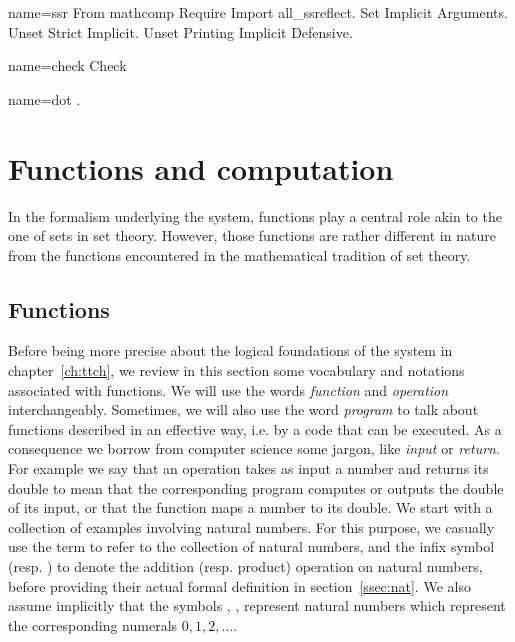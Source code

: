 \begin{coqdef}{name=ssr}
 From mathcomp Require Import all_ssreflect.
 Set Implicit Arguments.
 Unset Strict Implicit.
 Unset Printing Implicit Defensive.
\end{coqdef}
\begin{coqdef}{name=check}
Check
\end{coqdef}
\begin{coqdef}{name=dot}
.
\end{coqdef}

\chapter{Functions and computation}\label{ch:prog}

In the formalism underlying the \Coq{} system, functions play a
central role akin to the one of sets in set theory. However,
those functions are rather different in nature from the
functions encountered in the mathematical tradition of set theory.

\section{Functions}\label{sec:functions}
 Before being more
precise about the logical foundations of the \Coq{} system in
chapter~\ref{ch:ttch},
we review in this section some vocabulary and notations associated
with functions.
We will use the words \emph{function} and \emph{operation}
interchangeably. Sometimes, we will also use the word \emph{program}
to talk about functions described in an effective way, i.e. by a code
that can be executed. As a consequence we borrow from computer science
some jargon, like \emph{input} or \emph{return}. For example we say that
an operation takes as input a number and returns its double to mean
that the corresponding program computes or outputs the double of its
input, or that the function maps a number to its double. We start with
a collection of examples involving natural numbers. For this purpose,
we casually use the \Coq{} term  to refer to the collection of natural
numbers, and the infix symbol  \C{+} (resp. \C{*}) to denote the  addition
(resp. product) operation on natural numbers, before providing their
actual formal definition in section~\ref{ssec:nat}. We also
assume implicitly that the \Coq{} symbols  , , 
represent natural numbers which represent the corresponding numerals
$0, 1, 2, \dots$.



